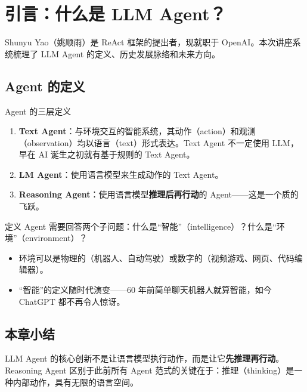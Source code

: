 \section{引言：什么是 LLM Agent？}

Shunyu Yao（姚顺雨）是 ReAct 框架的提出者，现就职于 OpenAI。本次讲座系统梳理了 LLM Agent 的定义、历史发展脉络和未来方向。

\subsection{Agent 的定义}

\begin{importantbox}{Agent 的三层定义}
\begin{enumerate}
    \item \textbf{Text Agent}：与环境交互的智能系统，其动作（action）和观测（observation）均以语言（text）形式表达。Text Agent 不一定使用 LLM，早在 AI 诞生之初就有基于规则的 Text Agent。
    \item \textbf{LM Agent}：使用语言模型来生成动作的 Text Agent。
    \item \textbf{Reasoning Agent}：使用语言模型\textbf{推理后再行动}的 Agent——这是一个质的飞跃。
\end{enumerate}
\end{importantbox}

定义 Agent 需要回答两个子问题：什么是``智能''（intelligence）？什么是``环境''（environment）？

\begin{itemize}
    \item 环境可以是物理的（机器人、自动驾驶）或数字的（视频游戏、网页、代码编辑器）。
    \item ``智能''的定义随时代演变——60 年前简单聊天机器人就算智能，如今 ChatGPT 都不再令人惊讶。
\end{itemize}

\subsection{本章小结}

LLM Agent 的核心创新不是让语言模型执行动作，而是让它\textbf{先推理再行动}。Reasoning Agent 区别于此前所有 Agent 范式的关键在于：推理（thinking）是一种内部动作，具有无限的语言空间。

